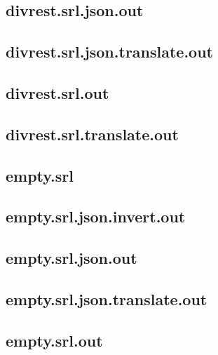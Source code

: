 \subsection{divrest.srl.json.out}
\label{app:divrest_srl.json.out}

\subsection{divrest.srl.json.translate.out}
\label{app:divrest_srl.json.translate.out}

\subsection{divrest.srl.out}
\label{app:divrest_srl.out}

\subsection{divrest.srl.translate.out}
\label{app:divrest_srl.translate.out}

\subsection{empty.srl}
\label{app:empty_srl}

\subsection{empty.srl.json.invert.out}
\label{app:empty_srl.json.invert.out}

\subsection{empty.srl.json.out}
\label{app:empty_srl.json.out}

\subsection{empty.srl.json.translate.out}
\label{app:empty_srl.json.translate.out}

\subsection{empty.srl.out}
\label{app:empty_srl.out}

